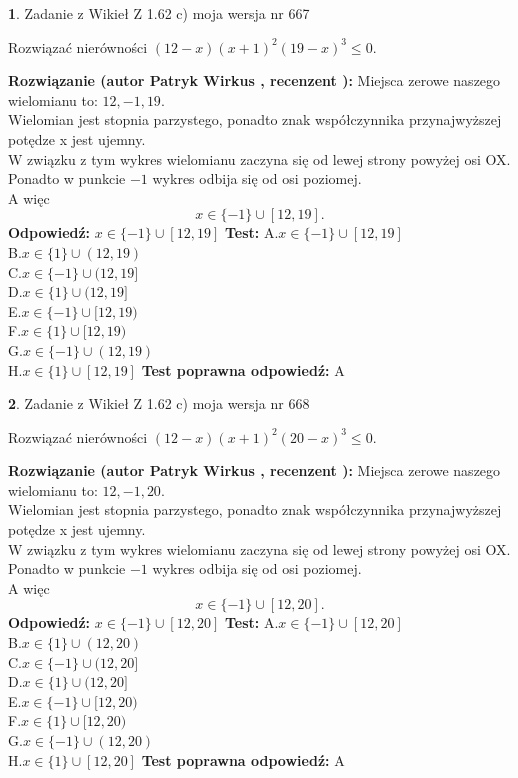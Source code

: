 \documentclass[12pt, a4paper]{article}
\theoremstyle{definition} %
\newtheorem{zad}{}
\newcommand{\zadStart}[1]{\begin{zad}#1\newline}
\newcommand{\zadStop}{\end{zad}}
\newcommand{\rozwStart}[2]{\noindent \textbf{Rozwiązanie (autor #1 , recenzent #2): }\newline}
\newcommand{\rozwStop}{\newline}
\newcommand{\odpStart}{\noindent \textbf{Odpowiedź:}\newline}
\newcommand{\odpStop}{\newline}
\newcommand{\testStart}{\noindent \textbf{Test:}\newline}
\newcommand{\testStop}{\newline}
\newcommand{\kluczStart}{\noindent \textbf{Test poprawna odpowiedź:}\newline}
\newcommand{\kluczStop}{\newline}
\begin{document}
\zadStart{Zadanie z Wikieł Z 1.62 c) moja wersja nr 667}

Rozwiązać nierówności $(12-x)(x+1)^{2}(19-x)^{3}\le0$.
\zadStop
\rozwStart{Patryk Wirkus}{}
Miejsca zerowe naszego wielomianu to: $12, -1, 19$.\\
Wielomian jest stopnia parzystego, ponadto znak współczynnika przy\linebreak najwyższej potędze x jest ujemny.\\ W związku z tym wykres wielomianu zaczyna się od lewej strony powyżej osi OX.\\
Ponadto w punkcie $-1$ wykres odbija się od osi poziomej.\\
A więc $$x \in \{-1\} \cup [12,19].$$
\rozwStop
\odpStart
$x \in \{-1\} \cup [12,19]$
\odpStop
\testStart
A.$x \in \{-1\} \cup [12,19]$\\
B.$x \in \{1\} \cup (12,19)$\\
C.$x \in \{-1\} \cup (12,19]$\\
D.$x \in \{1\} \cup (12,19]$\\
E.$x \in \{-1\} \cup [12,19)$\\
F.$x \in \{1\} \cup [12,19)$\\
G.$x \in \{-1\} \cup (12,19)$\\
H.$x \in \{1\} \cup [12,19]$
\testStop
\kluczStart
A
\kluczStop



\zadStart{Zadanie z Wikieł Z 1.62 c) moja wersja nr 668}

Rozwiązać nierówności $(12-x)(x+1)^{2}(20-x)^{3}\le0$.
\zadStop
\rozwStart{Patryk Wirkus}{}
Miejsca zerowe naszego wielomianu to: $12, -1, 20$.\\
Wielomian jest stopnia parzystego, ponadto znak współczynnika przy\linebreak najwyższej potędze x jest ujemny.\\ W związku z tym wykres wielomianu zaczyna się od lewej strony powyżej osi OX.\\
Ponadto w punkcie $-1$ wykres odbija się od osi poziomej.\\
A więc $$x \in \{-1\} \cup [12,20].$$
\rozwStop
\odpStart
$x \in \{-1\} \cup [12,20]$
\odpStop
\testStart
A.$x \in \{-1\} \cup [12,20]$\\
B.$x \in \{1\} \cup (12,20)$\\
C.$x \in \{-1\} \cup (12,20]$\\
D.$x \in \{1\} \cup (12,20]$\\
E.$x \in \{-1\} \cup [12,20)$\\
F.$x \in \{1\} \cup [12,20)$\\
G.$x \in \{-1\} \cup (12,20)$\\
H.$x \in \{1\} \cup [12,20]$
\testStop
\kluczStart
A
\kluczStop
\end{document}
